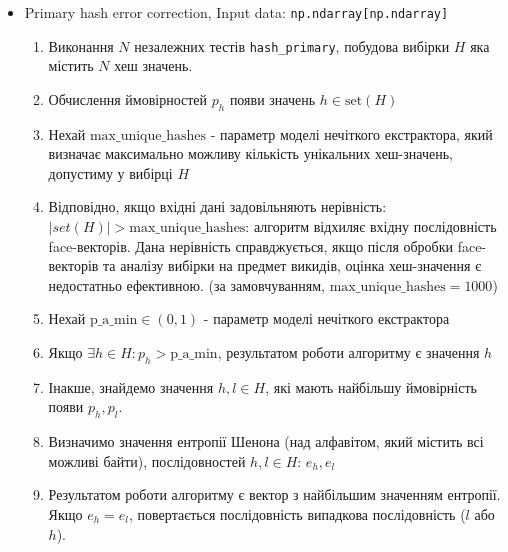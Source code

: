 \documentclass[11pt]{article}
\providecommand{\tightlist}{%
      \setlength{\itemsep}{0pt}\setlength{\parskip}{0pt}}
\def\gt{>}
\begin{document}
    \begin{itemize}
\tightlist
\item
  Primary hash error correction, Input data:
  \texttt{np.ndarray{[}np.ndarray{]}}

  \begin{enumerate}
  \def\labelenumi{\arabic{enumi}.}
  \tightlist
  \item
    Виконання \(N\) незалежних тестів \texttt{hash\_primary}, побудова
    вибірки \(H\) яка містить \(N\) хеш значень.
  \item
    Обчислення ймовірностей \(p_h\) появи значень
    \(h \in \text{set}(H)\)
  \item
    Нехай \(\text{max_unique_hashes}\) - параметр моделі нечіткого
    екстрактора, який визначає максимально можливу кількість унікальних
    хеш-значень, допустиму у вибірці \(H\)
  \item
    Відповідно, якщо вхідні дані задовільняють нерівність:
    \(|set(H)| \gt \text{max_unique_hashes}\): алгоритм відхиляє вхідну
    послідовність face-векторів. Дана нерівність справджується, якщо
    після обробки face-векторів та аналізу вибірки на предмет викидів,
    оцінка хеш-значення є недостатньо ефективною. (за замовчуванням,
    \(\text{max_unique_hashes} = 1000\))
  \item
    Нехай \(\text{p_a_min} \in (0,1)\) - параметр моделі нечіткого
    екстрактора
  \item
    Якщо \(\exists h \in H: p_h>\text{p_a_min}\), результатом роботи
    алгоритму є значення \(h\)
  \item
    Інакше, знайдемо значення \(h,l \in H\), які мають найбільшу
    ймовірність появи \(p_h,p_l\).
  \item
    Визначимо значення ентропії Шенона (над алфавітом, який містить всі
    можливі байти), послідовностей \(h,l \in H\): \(e_h, e_l\)
  \item
    Результатом роботи алгоритму є вектор з найбільшим значенням
    ентропії. Якщо \(e_h = e_l\), повертається послідовність випадкова
    послідовність (\(l\) або \(h\)).
  \end{enumerate}
\end{itemize}
\end{document}
